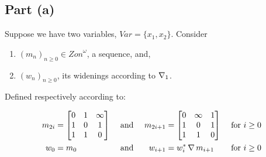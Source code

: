 \subsection{Part (a)}\label{sec:q-1-a}

Suppose we have two variables, $\mathit{Var}= \{x_1, x_2\}$. Consider

\begin{enumerate}[-]\itemsep0em
\item $(m_n)_{n\geq0}\in\mathit{Zon}^\omega$, a sequence, and,
\item $(w_n)_{n\geq0}$, its widenings according to $\operatorname{\nabla}_1$.
\end{enumerate}

\noindent
Defined respectively according to:

\begin{align*}
  m_{2i} & =
  \begin{bmatrix}
    0 & 1 & \infty \\
    1 & 0 & 1 \\
    1 & 1 & 0
  \end{bmatrix}
  && \text{ and } &
  m_{2i+1} & =
  \begin{bmatrix}
    0 & \infty & 1 \\
    1 & 0 & 1 \\
    1 & 1 & 0
  \end{bmatrix}
  && \text{ for } i\geq0\\
  w_0 & = m_0
  && \text{ and } &
  w_{i+1} & = w_i^\ast\operatorname{\nabla} m_{i+1}
  && \text{ for } i\geq0
\end{align*}


